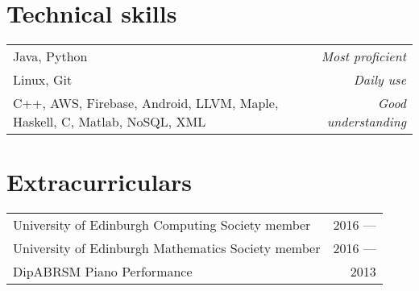 \documentclass[11pt,a4paper]{article}
\begin{document}
\section*{Technical skills}
\begin{tabularx}{\textwidth}{X r}
    Java, Python & \textit{Most proficient} \\
    Linux, Git & \textit{Daily use} \\
    C++, AWS, Firebase, Android, LLVM, Maple, Haskell, C, Matlab, NoSQL, XML & \textit{Good understanding} \\
\end{tabularx}

\midrule
\section*{Extracurriculars}
\begin{tabularx}{\textwidth}{X r}
    University of Edinburgh Computing Society member & 2016 --- \\
    University of Edinburgh Mathematics Society member & 2016 ---\\
    DipABRSM Piano Performance & 2013
\end{tabularx}
\end{document}
